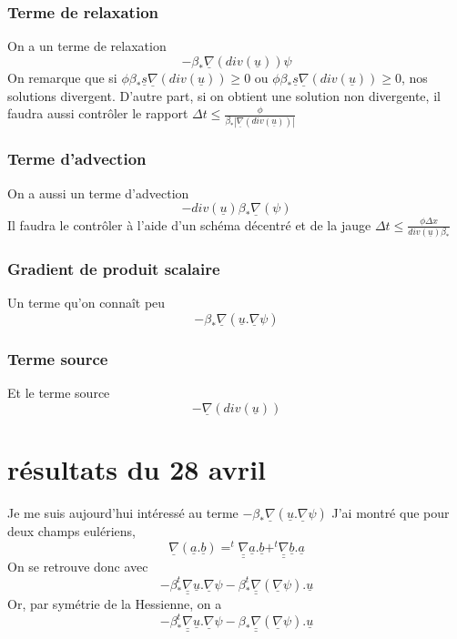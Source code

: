 \documentclass[a4paper,10pt]{article}
\begin{document}
  \subsubsection{Terme de relaxation}
  On a un terme de relaxation
  \[-\beta_*\underline{\nabla}(div(\underline{u}))\psi\]
  On remarque que si $\phi\beta_*\underline s\underline{\nabla}(div(\underline{u}))\geq0$ ou
  $\phi\beta_*\underline s\underline{\nabla}(div(\underline{u}))\geq0$, nos solutions divergent. D'autre part, si on obtient
  une solution non divergente, il faudra aussi contrôler le rapport
  $\Delta t\leq\frac\phi{\beta_*|\underline\nabla(div(\underline u))|}$
  \subsubsection{Terme d'advection}
  On a aussi un terme d'advection
  \[-div(\underline{u})\beta_*\underline\nabla(\psi)\]
  Il faudra le contrôler à l'aide d'un schéma décentré et de la jauge $\Delta t\leq \frac{\phi\Delta x}{div(\underline u) \beta_*}$
  \subsubsection{Gradient de produit scalaire}
  Un terme qu'on connaît peu
  \[-\beta_*\underline{\nabla}(\underline{u}.\underline{\nabla}\psi)\]
  \subsubsection{Terme source}
  Et le terme source
  \[-\underline{\nabla}(div(\underline{u}))\]
  \section{résultats du 28 avril}
  Je me suis aujourd'hui intéressé au terme $-\beta_*\underline{\nabla}(\underline{u}.\underline{\nabla}\psi)$
  J'ai montré que pour deux champs eulériens,
  \[\underline\nabla(\underline a.\underline b)=^t\underline{\underline\nabla}\underline a.\underline b+^t\underline{\underline\nabla}\underline b.\underline a\]
  On se retrouve donc avec
  \[-\beta_*^t\underline{\underline\nabla}\underline u.\underline\nabla \psi-\beta_*^t\underline{\underline\nabla}(\underline\nabla \psi).\underline u\]
  Or, par symétrie de la Hessienne, on a
  \[-\beta_*^t\underline{\underline\nabla}\underline u.\underline\nabla \psi-\beta_*\underline{\underline\nabla}(\underline\nabla \psi).\underline u\]
\end{document}
